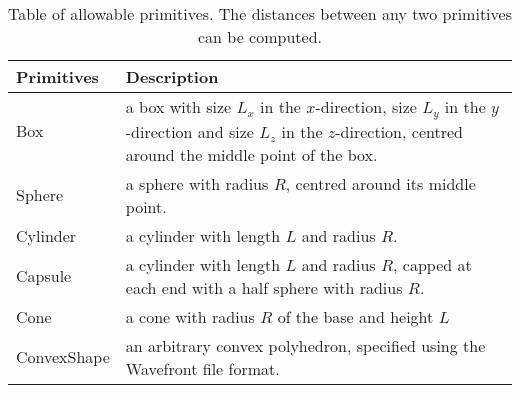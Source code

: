 \documentclass[10pt,a4paper]{article}
\begin{document}
\begin{table}
	\centering
	\begin{tabular}{@{}lp{10cm}@{}}
	\toprule
	Primitives & Description\\
	\midrule
	Box & a box with size $L_x$ in the $x$-direction, size $L_y$ in the $y$-direction and size $L_z$ in the $z$-direction,
	      centred around the middle point of the box.\\
	Sphere & a sphere with radius $R$, centred around its middle point.\\
	Cylinder & a cylinder with length $L$ and radius $R$. \\
	Capsule & a cylinder with length $L$ and radius $R$, capped at each end with a half sphere with radius $R$.\\
    Cone & a cone with radius $R$ of the base and height $L$\\
    ConvexShape & an arbitrary convex polyhedron, specified using the Wavefront file format.\\
	\bottomrule
	\end{tabular}
	
	\caption{Table of allowable primitives. The distances between any two primitives can be computed.}
    \label{table:primitives}
\end{table}


{}

\end{document}

